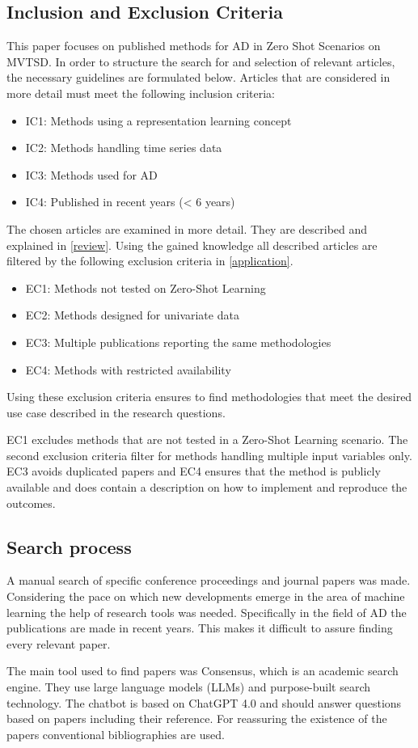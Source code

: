 \subsection{Inclusion and Exclusion Criteria}\label{criteria}
This paper focuses on published methods for AD in Zero Shot Scenarios on MVTSD. In order to structure the search for and selection of relevant articles, the necessary guidelines are formulated below. Articles that are considered in more detail must meet the following inclusion criteria:
\begin{itemize}
\item IC1: Methods using a representation learning concept
\item IC2: Methods handling time series data
\item IC3: Methods used for AD
\item IC4: Published in recent years (< 6 years)
\end{itemize}
The chosen articles are examined in more detail. They are described and explained in \autoref{review}. Using the gained knowledge all described articles are filtered by the following exclusion criteria in \autoref{application}.
\begin{itemize}
\item EC1: Methods not tested on Zero-Shot Learning
\item EC2: Methods designed for univariate data
\item EC3: Multiple publications reporting the same methodologies
\item EC4: Methods with restricted availability
\end{itemize}
Using these exclusion criteria ensures to find methodologies that meet the desired use case described in the research questions.

EC1 excludes methods that are not tested in a Zero-Shot Learning scenario. The second exclusion criteria filter for methods handling multiple input variables only. EC3 avoids duplicated papers and EC4 ensures that the method is publicly available and does contain a description on how to implement and reproduce the outcomes.
\subsection{Search process}
A manual search of specific conference proceedings and journal papers was made. Considering the pace on which new developments emerge in the area of machine learning the help of research tools was needed. Specifically in the field of AD the publications are made in recent years. This makes it difficult to assure finding every relevant paper.

The main tool used to find papers was Consensus, which is an academic search engine. They use large language models (LLMs) and purpose-built search technology. The chatbot is based on ChatGPT 4.0 and should answer questions based on papers including their reference. For reassuring the existence of the papers conventional bibliographies are used.
